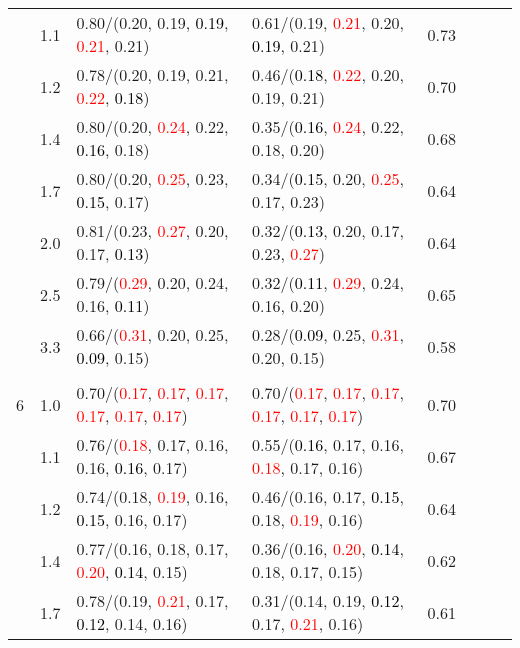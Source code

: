 \documentclass[10pt,a4paper]{report}
\begin{document}
\begin{table}[!htbp]
\begin{center}
{\begin{tabular}{ccllcccc}
			&1.1&0.80/(0.20, 0.19, \textcolor{black}{0.19}, \textcolor{red}{0.21}, 0.21)&0.61/(0.19, \textcolor{red}{0.21}, 0.20, \textcolor{black}{0.19}, 0.21)&0.73\\
			&1.2&0.78/(0.20, 0.19, 0.21, \textcolor{red}{0.22}, \textcolor{black}{0.18})&0.46/(\textcolor{black}{0.18}, \textcolor{red}{0.22}, 0.20, 0.19, 0.21)&0.70\\
			&1.4&0.80/(0.20, \textcolor{red}{0.24}, 0.22, \textcolor{black}{0.16}, 0.18)&0.35/(\textcolor{black}{0.16}, \textcolor{red}{0.24}, 0.22, 0.18, 0.20)&0.68\\
			&1.7&0.80/(0.20, \textcolor{red}{0.25}, 0.23, \textcolor{black}{0.15}, 0.17)&0.34/(\textcolor{black}{0.15}, 0.20, \textcolor{red}{0.25}, 0.17, 0.23)&0.64\\
			&2.0&0.81/(0.23, \textcolor{red}{0.27}, 0.20, 0.17, \textcolor{black}{0.13})&0.32/(\textcolor{black}{0.13}, 0.20, 0.17, 0.23, \textcolor{red}{0.27})&0.64\\
			&2.5&0.79/(\textcolor{red}{0.29}, 0.20, 0.24, 0.16, \textcolor{black}{0.11})&0.32/(\textcolor{black}{0.11}, \textcolor{red}{0.29}, 0.24, 0.16, 0.20)&0.65\\
			&3.3&0.66/(\textcolor{red}{0.31}, 0.20, 0.25, \textcolor{black}{0.09}, 0.15)&0.28/(\textcolor{black}{0.09}, 0.25, \textcolor{red}{0.31}, 0.20, 0.15)&0.58\\
			&&&&\\
			6			&1.0&0.70/(\textcolor{red}{0.17}, \textcolor{red}{0.17}, \textcolor{red}{0.17}, \textcolor{red}{0.17}, \textcolor{red}{0.17}, \textcolor{red}{0.17})&0.70/(\textcolor{red}{0.17}, \textcolor{red}{0.17}, \textcolor{red}{0.17}, \textcolor{red}{0.17}, \textcolor{red}{0.17}, \textcolor{red}{0.17})&0.70\\
			&1.1&0.76/(\textcolor{red}{0.18}, 0.17, 0.16, 0.16, \textcolor{black}{0.16}, 0.17)&0.55/(\textcolor{black}{0.16}, 0.17, 0.16, \textcolor{red}{0.18}, 0.17, 0.16)&0.67\\
			&1.2&0.74/(0.18, \textcolor{red}{0.19}, 0.16, \textcolor{black}{0.15}, 0.16, 0.17)&0.46/(0.16, 0.17, \textcolor{black}{0.15}, 0.18, \textcolor{red}{0.19}, 0.16)&0.64\\
			&1.4&0.77/(0.16, 0.18, 0.17, \textcolor{red}{0.20}, \textcolor{black}{0.14}, 0.15)&0.36/(0.16, \textcolor{red}{0.20}, \textcolor{black}{0.14}, 0.18, 0.17, 0.15)&0.62\\
			&1.7&0.78/(0.19, \textcolor{red}{0.21}, 0.17, \textcolor{black}{0.12}, 0.14, 0.16)&0.31/(0.14, 0.19, \textcolor{black}{0.12}, 0.17, \textcolor{red}{0.21}, 0.16)&0.61\\

\end{tabular}}
\end{center}
\end{table}
\end{document}
